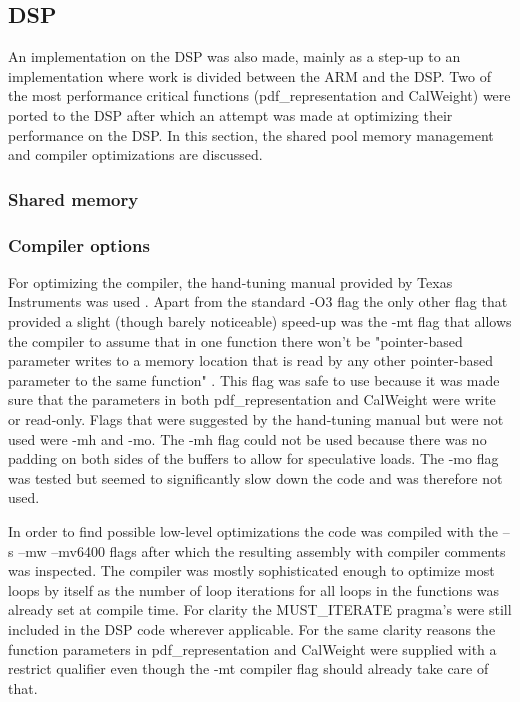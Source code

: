 \documentclass[final]{article}
\begin{document}
\subsection{DSP}
An implementation on the DSP was also made, mainly as a step-up to an implementation where work is divided between the ARM and the DSP.
Two of the most performance critical functions (pdf\_representation and CalWeight) were ported to the DSP after which an attempt was made at optimizing their performance on the DSP.
In this section, the shared pool memory management and compiler optimizations are discussed.

\subsubsection{Shared memory}


\subsubsection{Compiler options}
For optimizing the compiler, the hand-tuning manual provided by Texas Instruments was used \cite{handtuning}.
Apart from the standard -O3 flag the only other flag that provided a slight (though barely noticeable) speed-up was the -mt flag that allows the compiler to assume that in one function there won't be "pointer-based parameter writes to a memory location that is read by any other pointer-based parameter to the same function" \cite{handtuning}.
This flag was safe to use because it was made sure that the parameters in both pdf\_representation and CalWeight were write or read-only. Flags that were suggested by the hand-tuning manual but were not used were -mh and -mo. The -mh flag could not be used because there was no padding on both sides of the buffers to allow for speculative loads. The -mo flag was tested but seemed to significantly slow down the code and was therefore not used.

In order to find possible low-level optimizations the code was compiled with the –s –mw –mv6400 flags after which the resulting assembly with compiler comments was inspected. The compiler was mostly sophisticated enough to optimize most loops by itself as the number of loop iterations for all loops in the functions was already set at compile time. For clarity the MUST\_ITERATE pragma's were still included in the DSP code wherever applicable. For the same clarity reasons the function parameters in pdf\_representation and CalWeight were supplied with a restrict qualifier even though the -mt compiler flag should already take care of that.
\end{document}

